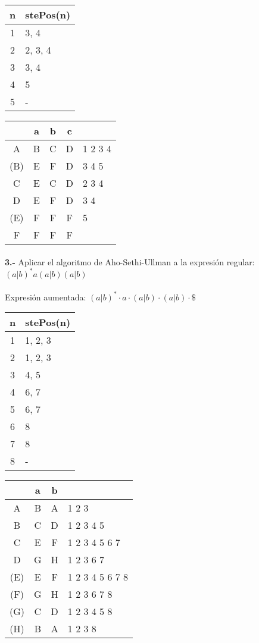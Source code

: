 \documentclass[11pt,a4paper]{report}
\begin{document}
\begin{tabular} {| c | l |}
\hline
n & stePos(n) \\ \hline
1 & 3, 4 \\ \hline
2 & 2, 3, 4 \\ \hline
3 & 3, 4 \\ \hline
4 & 5 \\ \hline
5 & - \\ \hline
\end{tabular}
\quad
\begin{tabular} {| c | c |c |c | l |}
\hline 
& a & b & c & \\ \hline
A & B & C & D & 1 2 3 4 \\ \hline
(B) & E & F & D & 3 4 5 \\ \hline
C & E & C & D & 2 3 4 \\ \hline
D & E & F & D & 3 4 \\ \hline
(E) & F & F & F & 5 \\ \hline
F & F & F & F & \\ \hline
\end{tabular}\paragraph{}
\textbf{3.-} Aplicar el algoritmo de Aho-Sethi-Ullman a la expresión regular: \textbf{$ (a|b)^*a(a|b)(a|b) $} \\
\\
Expresión aumentada: $ (a|b)^*\cdot a\cdot (a|b)\cdot (a|b)\cdot \$  $ \\

\begin{tabular} {| c | l |}
\hline
n & stePos(n) \\ \hline
1 & 1, 2, 3 \\ \hline
2 & 1, 2, 3 \\ \hline
3 & 4, 5 \\ \hline
4 & 6, 7 \\ \hline
5 & 6, 7 \\ \hline
6 & 8 \\ \hline
7 & 8 \\ \hline
8 & - \\ \hline
\end{tabular}
\quad
\begin{tabular} {| c | c |c | l |}
\hline 
& a & b & \\ \hline
A & B & A & 1 2 3 \\ \hline
B & C & D & 1 2 3 4 5 \\ \hline
C & E & F & 1 2 3 4 5 6 7 \\ \hline
D & G & H & 1 2 3 6 7 \\ \hline
(E) & E & F & 1 2 3 4 5 6 7 8 \\ \hline
(F) & G & H & 1 2 3 6 7 8 \\ \hline
(G) & C & D & 1 2 3 4 5 8 \\ \hline
(H) & B & A & 1 2 3 8 \\ \hline
\end{tabular}
\end{document}
